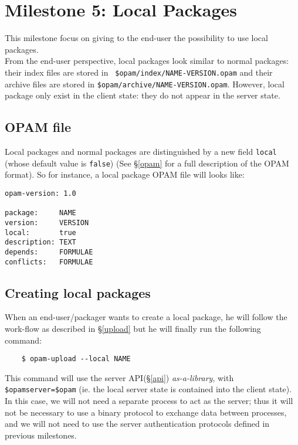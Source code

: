 \documentclass[a4paper,11pt]{article}
\begin{document}
\section{Milestone 5: Local Packages}

This milestone focus on giving to the end-user the possibility to use
local packages.\\

From the end-user perspective, local packages look similar to normal
packages: their index files are stored in {\tt
  \$opam/index/NAME-VERSION.opam} and their archive files are stored
in {\tt \$opam/archive/NAME-VERSION.opam}. However, local package only
exist in the client state: they do not appear in the server state.

\subsection{OPAM file}

Local packages and normal packages are distinguished by a new field
{\tt local} (whose default value is {\tt false}) (See \S\ref{opam} for
a full description of the OPAM format). So for instance, a local
package OPAM file will looks like:

\begin{verbatim}
opam-version: 1.0

package:     NAME
version:     VERSION
local:       true
description: TEXT
depends:     FORMULAE
conflicts:   FORMULAE
\end{verbatim}

\subsection{Creating local packages}

When an end-user/packager wants to create a local package, he will
follow the work-flow as described in \S\ref{upload} but he will
finally run the following command:

\begin{verbatim}
    $ opam-upload --local NAME
\end{verbatim}

This command will use the server API(\S\ref{api}) {\em as-a-library},
with {\tt \$opamserver=\$opam} (ie. the local server state is
contained into the client state). In this case, we will not need a
separate process to act as the server; thus it will not be necessary
to use a binary protocol to exchange data between processes, and we
will not need to use the server authentication protocols defined in
previous milestones.
\end{document}
